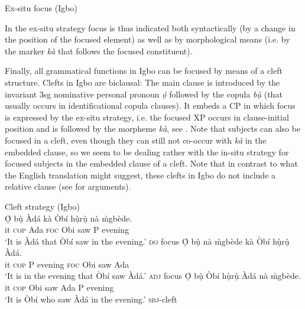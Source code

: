 \documentclass[output=paper,colorlinks,citecolor=brown]{langscibook}
\begin{document}
\enlargethispage{0.5\baselineskip}
\ea%
    \label{ex:amaechi:5}
    Ex-situ focus (Igbo)\\
    \z
\z

In the ex-situ strategy focus is thus indicated both syntactically (by a change in the position of the focused element) as well as by morphological means (i.e. by the marker \textit{k\`a} that follows the focused constituent).

Finally, all grammatical functions in Igbo can be focused by means of a cleft structure. Clefts in Igbo are biclausal: The main clause is introduced by the invariant 3sg nominative personal pronoun \textit{ọ́} followed by the copula  \textit{bụ̀} (that usually occurs in identificational copula clauses). It embeds a CP in which focus is expressed by the ex-situ strategy, i.e. the focused XP occurs in clause-initial position and is followed by the morpheme \textit{k\`a}, see . Note that subjects can also be focused in a cleft, even though they can still not co-occur with \textit{k\`a} in the embedded clause, so we seem to be dealing rather with the in-situ strategy for focused subjects in the embedded clause of a cleft. Note that in contrast to what the English translation might suggest, these clefts in Igbo do not include a relative clause (see \citealt{Amaechi2018} for arguments).

\ea%
    \label{ex:amaechi:6}
    Cleft strategy (Igbo)\\
    \ea\label{ex:amaechi:6a}
    \gll    Ọ́ bụ̀ Àdá kà Òbí hụ̀rụ̀ nà {\`m}gbède.\\
            it \textsc{cop} Ada \textsc{foc} Obi saw P evening\\
    \glt    `It is Àdá that Òbí saw in the evening.' \hfill{\textsc{do} focus}
    \ex\label{ex:amaechi:6b}
    \gll    Ọ́ bụ̀ nà {\`m}gbède kà Òbí hụ̀rụ̀ Àdá.\\
            it \textsc{cop} P evening \textsc{foc} Obi saw Ada\\
    \glt    `It is in the evening that Òbí saw Àdá.' \hfill{\textsc{adj}  focus}
    \ex\label{ex:amaechi:6c}
    \gll    Ọ́ bụ̀ Òbí hụ̀rụ̀ Àdá nà {\`m}gbède.\\
            it \textsc{cop} Obi saw Ada P evening\\
    \glt    `It is Òbí who saw Àdá in the evening.' \hfill{\textsc{sbj}-cleft}
    \z
\z
\end{document}
